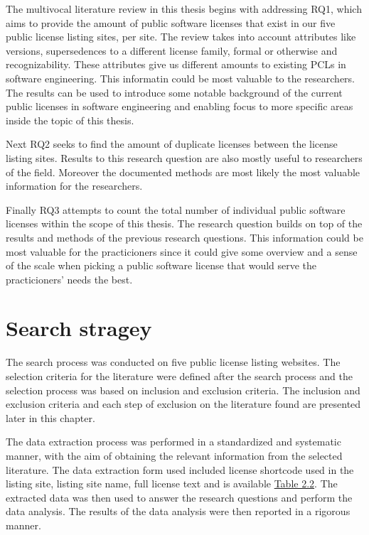 The multivocal literature review in this thesis begins with addressing RQ1, which aims to provide the amount of public software licenses that exist in our five public license listing sites, per site. The review takes into account attributes like versions, supersedences to a different license family, formal or otherwise and recognizability. These attributes give us different amounts to existing PCLs in software engineering. This informatin could be most valuable to the researchers. The results can be used to introduce some notable background of the current public licenses in software engineering and enabling focus to more specific areas inside the topic of this thesis.

Next RQ2 seeks to find the amount of duplicate licenses between the license listing sites. Results to this research question are also mostly useful to researchers of the field. Moreover the documented methods are most likely the most valuable information for the researchers.

Finally RQ3 attempts to count the total number of individual public software licenses within the scope of this thesis. The research question builds on top of the results and methods of the previous research questions. This information could be most valuable for the practicioners since it could give some overview and a sense of the scale when picking a public software license that would serve the practicioners' needs the best.

\section{Search stragey}
The search process was conducted on five public license listing websites. The selection criteria for the literature were defined after the search process and the selection process was based on inclusion and exclusion criteria. The inclusion and exclusion criteria and each step of exclusion on the literature found are presented later in this chapter.

The data extraction process was performed in a standardized and systematic manner, with the aim of obtaining the relevant information from the selected literature. The data extraction form used included license shortcode used in the listing site, listing site name, full license text and is available  \hyperref[table:extraction]{Table 2.2}. The extracted data was then used to answer the research questions and perform the data analysis. The results of the data analysis were then reported in a rigorous manner.

